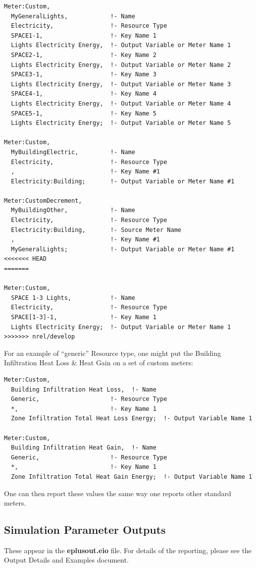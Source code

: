 \begin{lstlisting}
Meter:Custom,
  MyGeneralLights,            !- Name
  Electricity,                !- Resource Type
  SPACE1-1,                   !- Key Name 1
  Lights Electricity Energy,  !- Output Variable or Meter Name 1
  SPACE2-1,                   !- Key Name 2
  Lights Electricity Energy,  !- Output Variable or Meter Name 2
  SPACE3-1,                   !- Key Name 3
  Lights Electricity Energy,  !- Output Variable or Meter Name 3
  SPACE4-1,                   !- Key Name 4
  Lights Electricity Energy,  !- Output Variable or Meter Name 4
  SPACE5-1,                   !- Key Name 5
  Lights Electricity Energy;  !- Output Variable or Meter Name 5

Meter:Custom,
  MyBuildingElectric,         !- Name
  Electricity,                !- Resource Type
  ,                           !- Key Name #1
  Electricity:Building;       !- Output Variable or Meter Name #1

Meter:CustomDecrement,
  MyBuildingOther,            !- Name
  Electricity,                !- Resource Type
  Electricity:Building,       !- Source Meter Name
  ,                           !- Key Name #1
  MyGeneralLights;            !- Output Variable or Meter Name #1
<<<<<<< HEAD
=======

Meter:Custom,
  SPACE 1-3 Lights,           !- Name
  Electricity,                !- Resource Type
  SPACE[1-3]-1,               !- Key Name 1
  Lights Electricity Energy;  !- Output Variable or Meter Name 1
>>>>>>> nrel/develop
\end{lstlisting}

For an example of ``generic'' Resource type, one might put the Building Infiltration Heat Loss \& Heat Gain on a set of custom meters:

\begin{lstlisting}
Meter:Custom,
  Building Infiltration Heat Loss,  !- Name
  Generic,                    !- Resource Type
  *,                          !- Key Name 1
  Zone Infiltration Total Heat Loss Energy;  !- Output Variable Name 1

Meter:Custom,
  Building Infiltration Heat Gain,  !- Name
  Generic,                    !- Resource Type
  *,                          !- Key Name 1
  Zone Infiltration Total Heat Gain Energy;  !- Output Variable Name 1
\end{lstlisting}

One can then report these values the same way one reports other standard meters.

\subsection{Simulation Parameter Outputs}\label{simulation-parameter-outputs}

These appear in the \textbf{eplusout.eio} file. For details of the reporting, please see the Output Details and Examples document.
